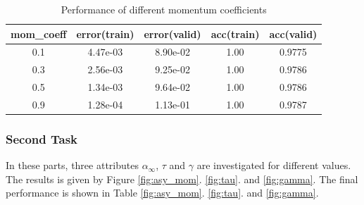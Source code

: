 \documentclass[11pt]{article}
\begin{document}
\begin{table}
\begin{center}
\begin{tabular}{ c c c c c} 
\hline
mom\_coeff & error(train) & error(valid) & acc(train) & acc(valid)\\
\hline
\hline
0.1& 4.47e-03 & 8.90e-02 & 1.00 & 0.9775 \\ 
0.3 & 2.56e-03 & 9.25e-02 & 1.00 & 0.9786 \\ 
0.5 & 1.34e-03 & 9.64e-02 & 1.00 & 0.9786 \\ 
0.9  &  1.28e-04  & 1.13e-01 & 1.00 & 0.9787 \\
\end{tabular}
\caption{Performance of different momentum coefficients}
\label{tb:mom}
\end{center}	
\end{table}

\subsubsection{Second Task}
In these parts, three attributes $\alpha_\infty$, $\tau$ and $\gamma$ are investigated for different values. The results is given by Figure \ref{fig:asy_mom}. \ref{fig:tau}. and \ref{fig:gamma}. The final performance is shown in Table \ref{fig:asy_mom}. \ref{fig:tau}. and \ref{fig:gamma}.
\end{document}
